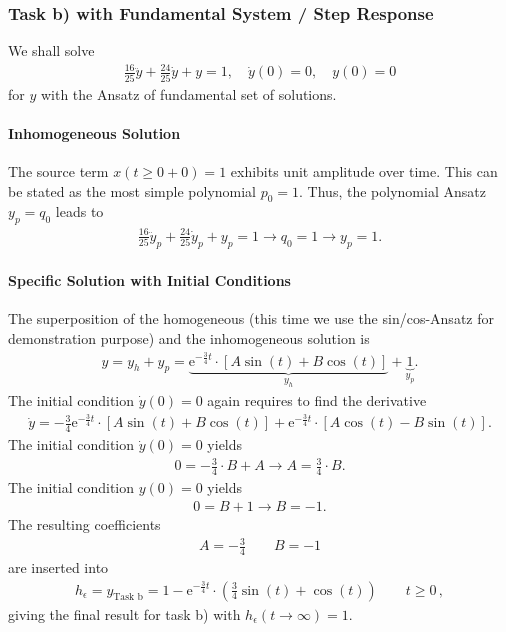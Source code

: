 \subsubsection{Task b) with Fundamental System / Step Response}
We shall solve
\begin{align}
\frac{16}{25} \ddot{y} + \frac{24}{25} \dot{y} + y = 1, \quad
\dot{y}(0) = 0,\quad y(0)=0
\end{align}
for $y$ with the Ansatz of fundamental set of solutions.

\paragraph{Inhomogeneous Solution}
The source term $x(t\geq 0+0)=1$ exhibits unit
amplitude over time. This can be stated as the most simple polynomial $p_0=1$.
Thus, the polynomial Ansatz $y_p = q_0$ leads to
\begin{align}
\frac{16}{25} \ddot{y}_p + \frac{24}{25} \dot{y}_p + y_p = 1
\rightarrow q_0 = 1 \rightarrow  y_p = 1.
\end{align}

\paragraph{Specific Solution with Initial Conditions}
The superposition of the homogeneous (this time we use the sin/cos-Ansatz
 for demonstration purpose) and the inhomogeneous
solution is
\begin{align}
\label{eq:SpecificyTaskb}
y = y_h + y_p = \underbrace{
\mathrm{e}^{-\frac{3}{4} t} \cdot
\left[ A \sin(t) + B  \cos(t)\right]}_{y_h} +\underbrace{1}_{y_p}.
\end{align}
The initial condition $\dot{y}(0) = 0$ again requires to find the derivative
\begin{align}
\dot{y}
=
-\frac{3}{4}\mathrm{e}^{-\frac{3}{4} t} \cdot
\left[ A \sin(t) + B \cos(t)\right]
+
\mathrm{e}^{-\frac{3}{4} t} \cdot
\left[ A \cos(t)  - B \sin(t)\right].
\end{align}
The initial condition $\dot{y}(0) = 0$ yields
\begin{align}
0 = -\frac{3}{4}\cdot B + A \rightarrow A = \frac{3}{4}\cdot B.
\end{align}
The initial condition ${y}(0) = 0$ yields
\begin{align}
0 = B  + 1 \rightarrow B = -1.
\end{align}
The resulting coefficients
\begin{align}
A = -\frac{3}{4}\qquad B = -1
\end{align}
are inserted into 
\begin{align}
\label{eq:stepResponse}
\boxed{
h_\epsilon = y_\text{Task b} =
1 - \mathrm{e}^{-\frac{3}{4} t} \cdot
\left(\frac{3}{4} \sin(t) + \cos(t)\right) \qquad t \geq 0
}\,,
\end{align}
giving the final result for task b) with $h_\epsilon(t\to\infty) = 1$.

